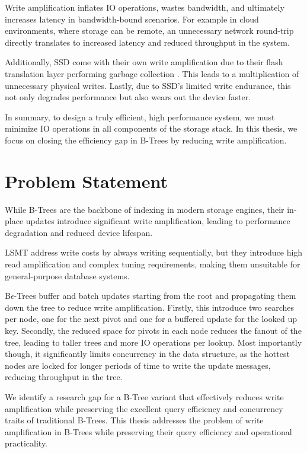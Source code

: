 Write amplification inflates \ac{IO} operations, wastes bandwidth, and ultimately increases latency in bandwidth-bound scenarios.
For example in cloud environments, where storage can be remote, an unnecessary network round-trip directly translates to increased latency and reduced throughput in the system.

Additionally, \ac{SSD} come with their own write amplification due to their flash translation layer performing garbage collection \cite{haas2023modern}. 
This leads to a multiplication of unnecessary physical writes. 
Lastly, due to \ac{SSD}'s limited write endurance, this not only degrades performance but also wears out the device faster.

In summary, to design a truly efficient, high performance system, we must minimize \ac{IO} operations in all components of the storage stack. 
In this thesis, we focus on closing the efficiency gap in B-Trees by reducing write amplification.

\section{Problem Statement}
While B-Trees are the backbone of indexing in modern storage engines, their in-place updates introduce significant write amplification, leading to performance degradation and reduced device lifespan. 

\ac{LSMT} address write costs by always writing sequentially, but they introduce high read amplification and complex tuning requirements, making them unsuitable for general-purpose database systems.

B$\epsilon$-Trees buffer and batch updates starting from the root and propagating them down the tree to reduce write amplification. 
Firstly, this introduce two searches per node, one for the next pivot and one for a buffered update for the looked up key.
Secondly, the reduced space for pivots in each node reduces the fanout of the tree, leading to taller trees and more \ac{IO} operations per lookup.
Most importantly though, it significantly limits concurrency in the data structure, as the hottest nodes are locked for longer periods of time to write the update messages, reducing throughput in the tree.

We identify a research gap for a B-Tree variant that effectively reduces write amplification while preserving the excellent query efficiency and concurrency traits of traditional B-Trees.
This thesis addresses the problem of write amplification in B-Trees while preserving their query efficiency and operational practicality.

